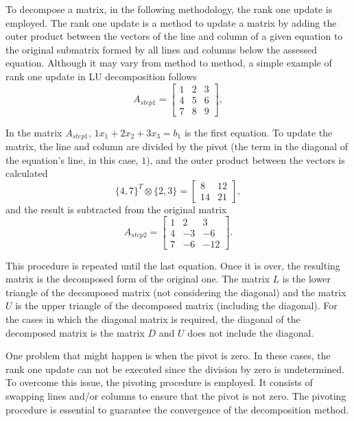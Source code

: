 To decompose a matrix, in the following methodology, the rank one update is employed. The rank one update is a method to update a matrix by adding the outer product between the vectors of the line and column of a given equation to the original submatrix formed by all lines and columns below the assessed equation. Although it may vary from method to method, a simple example of rank one update in LU decomposition follows 
\begin{equation*}
    A_{step1} =
    \begin{bmatrix}
        1 & 2 & 3 \\
        4 & 5 & 6 \\
        7 & 8 & 9
    \end{bmatrix},
\end{equation*}

In the matrix $A_{step1}$, $1x_1 + 2x_2 + 3x_3 = b_1$ is the first equation. To update the matrix, the line and column are divided by the pivot (the term in the diagonal of the equation's line, in this case, $1$), and the outer product between the vectors is calculated
\begin{equation*}
    \{4, 7\}^T \otimes \{2, 3\}  = 
    \begin{bmatrix}
        8 & 12 \\
        14 & 21
    \end{bmatrix},
\end{equation*}
and the result is subtracted from the original matrix
\begin{equation*}
    A_{step2} = 
    \begin{bmatrix}
        1 & 2 & 3 \\
        4 & -3 & -6 \\
        7 & -6 & -12
    \end{bmatrix}.
\end{equation*}

This procedure is repeated until the last equation. Once it is over, the resulting matrix is the decomposed form of the original one. The matrix $L$ is the lower triangle of the decomposed matrix (not considering the diagonal) and the matrix $U$ is the upper triangle of the decomposed matrix (including the diagonal). For the cases in which the diagonal matrix is required, the diagonal of the decomposed matrix is the matrix $D$ and $U$ does not include the diagonal.

One problem that might happen is when the pivot is zero. In these cases, the rank one update can not be executed since the division by zero is undetermined. To overcome this issue, the pivoting procedure is employed. It consists of swapping lines and/or columns to ensure that the pivot is not zero. The pivoting procedure is essential to guarantee the convergence of the decomposition method.

